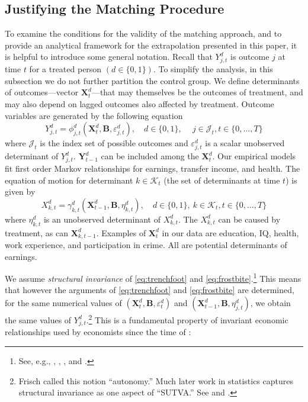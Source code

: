 \begin{figure}
\end{figure}

\subsection{Justifying the Matching Procedure} \label{section:just}

To examine the conditions for the validity of the matching approach, and to provide an analytical framework for the extrapolation presented in this paper, it is helpful to introduce some general notation. Recall that $Y^d_{j,t}$ is outcome $j$ at time $t$ for a treated person $(d\in\{0,1\})$. To simplify the analysis, in this subsection we do not further partition the control group. We define determinants of outcomes---vector $\bm{X}^d_t$---that may themselves be the outcomes of treatment, and may also depend on lagged outcomes also affected by treatment. Outcome variables are generated by the following equation
\begin{equation}\label{eq:trenchfoot}
Y^d_{j,t} = \phi^d_{j,t} (\bm{X}^d_t, \bm{B}, \varepsilon^d_{j,t}), \quad d \in \{0,1\}, \quad \  j \in \mathcal{J}_t, t \in \{0,\dots,T\}
\end{equation}
where $\mathcal{J}_t$ is the index set of possible outcomes and $\varepsilon^d_{j,t}$ is a scalar unobserved determinant of $Y^d_{j,t}$. $\bm{Y}^d_{t-1}$ can be included among the $\bm{X}^d_{t}$. Our empirical models fit first order Markov relationships for earnings, transfer income, and health. The equation of motion for determinant $k \in \mathcal{K}_t$ (the set of determinants at time $t$) is given by
\begin{equation}\label{eq:frostbite}
X^d_{k,t} = \gamma^d_{k,t} (\bm{X}^d_{t-1}, \bm{B}, \eta^d_{k,t}), \quad d \in \{0,1\}, \ k \in \mathcal{K}_t, t \in \{0,\dots,T\}
\end{equation}
where $\eta^d_{k,t}$ is an unobserved determinant of $X^d_{k,t}$. The $X^d_{k,t}$ can be caused by treatment, as can $\bm{X}^d_{k,t-1}$. Examples of $\bm{X}^d_t$ in our data are education, IQ, health, work experience, and participation in crime. All are potential determinants of earnings.

We assume \emph{structural invariance} of \eqref{eq:trenchfoot} and \eqref{eq:frostbite}.\footnote{See, e.g., \citet{Frisch_1938_autonomy}, \citet{Haavelmo_1943_Econometrica,Haavelmo_1944_Econometrica}, \citet{Hurwicz_1962_structural}, and \citet{Heckman_Pinto_2015_EconometTheory}.} This means that however the arguments of \eqref{eq:trenchfoot} and \eqref{eq:frostbite} are determined, for the same numerical values of $(\bm{X}^d_t, \bm{B}, \varepsilon^d_t)$ and $(\bm{X}^d_{t-1}, \bm{B}, \eta^d_{j,t})$, we obtain the same values of $Y^d_{j,t}$.\footnote{Frisch called this notion ``autonomy.'' Much later work in statistics captures structural invariance as one aspect of ``SUTVA.'' See \citet{Holland_1986_JASA} and \citet{Heckman_2008_ISR}.} This is a fundamental property of invariant economic relationships used by economists since the time of \citet{Frisch_1938_autonomy}:

